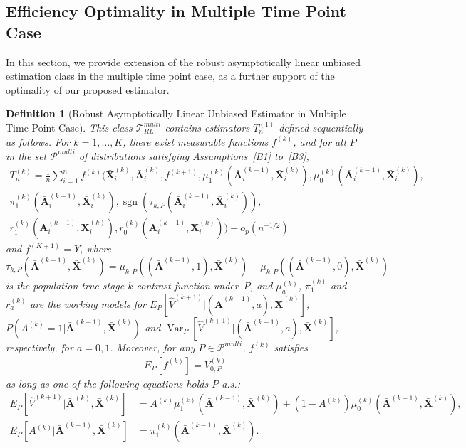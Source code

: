 \documentclass[11pt]{article}
\theoremstyle{referenceplain}
\theoremstyle{referencedefinition}
\newtheorem{definition}{Definition}
\theoremstyle{referenceremark}
\begin{document}
\subsection{Efficiency Optimality in Multiple Time Point Case}
In this section, we provide extension of the robust asymptotically linear unbiased estimation class in the multiple time point case, as a further support of the optimality of our proposed estimator.
\begin{definition}[Robust Asymptotically Linear Unbiased Estimator 
in Multiple Time Point Case]\label{multi-ralu}
    This class $\mathcal{T}_{RL}^{multi}$ contains estimators 
    $T_n^{(1)}$ defined sequentially as follows. For $k=1,\dots,K$, 
    there exist measurable functions $f^{(k)}$, and for all $P$ in the 
    set $\mathcal{P}^{multi}$ of distributions satisfying 
    Assumptions~\ref{B1} to~\ref{B3},
    \begin{align*}
        T_n^{(k)}=\frac{1}{n}\sum_{i=1}^n 
        f^{(k)}\Big(\bar{\mathbf{X}}_i^{(k)},\bar{\mathbf{A}}_i^{(k)}, 
        f^{(k+1)},\mu_1^{(k)}(\bar{\mathbf{A}}_i^{(k-1)},
        \bar{\mathbf{X}}_i^{(k)}),
        \mu_0^{(k)}(\bar{\mathbf{A}}_i^{(k-1)},
        \bar{\mathbf{X}}_i^{(k)}),\\
        \pi_1^{(k)}(\bar{\mathbf{A}}_i^{(k-1)},
        \bar{\mathbf{X}}_i^{(k)}),
        \operatorname{sgn}\left(\tau_{k,P}\left(
        \bar{\mathbf{A}}_i^{(k-1)},
        \bar{\mathbf{X}}_i^{(k)}\right)\right),\\
        r_1^{(k)}(\bar{\mathbf{A}}_i^{(k-1)},
        \bar{\mathbf{X}}_i^{(k)}),
        r_0^{(k)}(\bar{\mathbf{A}}_i^{(k-1)},
        \bar{\mathbf{X}}_i^{(k)})
        \Big)+o_p(n^{-1/2})
    \end{align*}
    and $f^{(K+1)}=Y$, where 
    $\tau_{k,P}(\bar{\mathbf{A}}^{(k-1)},\bar{\mathbf{X}}^{(k)})
    =\mu_{k,P}((\bar{\mathbf{A}}^{(k-1)},1),\bar{\mathbf{X}}^{(k)})
    -\mu_{k,P}((\bar{\mathbf{A}}^{(k-1)},0),\bar{\mathbf{X}}^{(k)})$ 
    is the population-true stage-$k$ contrast function under~$P$, 
    and $\mu_a^{(k)}$, $\pi_1^{(k)}$ and $r_a^{(k)}$ are the 
    working models for $E_P[\widehat{V}^{(k+1)}|
    (\bar{\mathbf{A}}^{(k-1)},a),\bar{\mathbf{X}}^{(k)}]$, 
    $P(A^{(k)}=1|\bar{\mathbf{A}}^{(k-1)},\bar{\mathbf{X}}^{(k)})$ 
    and $\operatorname{Var}_P[\widehat{V}^{(k+1)}|
    (\bar{\mathbf{A}}^{(k-1)},a),\bar{\mathbf{X}}^{(k)}]$, 
    respectively, for $a=0,1$. 
    Moreover, for any $P\in\mathcal{P}^{multi}$, $f^{(k)}$ satisfies
    \begin{align*}
        E_P[f^{(k)}] = V_{0,P}^{(k)}
    \end{align*}
    as long as one of the following equations holds $P$-a.s.:
    \begin{align*}
        E_P[\widehat{V}^{(k+1)}|\bar{\mathbf{A}}^{(k)},
        \bar{\mathbf{X}}^{(k)}] 
        &= A^{(k)} \mu_1^{(k)}(\bar{\mathbf{A}}^{(k-1)},
        \bar{\mathbf{X}}^{(k)})
        +(1-A^{(k)})\mu_0^{(k)}(\bar{\mathbf{A}}^{(k-1)},
        \bar{\mathbf{X}}^{(k)}),\\
        E_P[A^{(k)}|\bar{\mathbf{A}}^{(k-1)},\bar{\mathbf{X}}^{(k)}]
        &=\pi_1^{(k)}(\bar{\mathbf{A}}^{(k-1)},\bar{\mathbf{X}}^{(k)}).
    \end{align*}
\end{definition}
\end{document}
